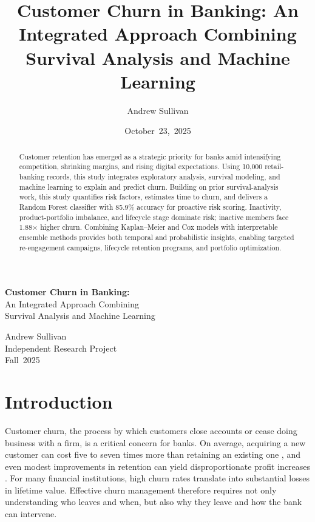 \documentclass[12pt]{article}
\title{Customer Churn in Banking: An Integrated Approach Combining Survival Analysis and Machine Learning}
\author{Andrew Sullivan}
\date{October~23,~2025}
\begin{document}
\begin{titlepage}
  \centering
  \vspace*{2cm}
  \Huge\textbf{Customer Churn in Banking:}\\An Integrated Approach Combining\\Survival Analysis and Machine Learning
  \vspace{1.5cm}

  \large
  Andrew Sullivan\\[0.5cm]
  Independent Research Project\\[0.5cm]
  Fall~2025
  
  \vfill
\end{titlepage}
\thispagestyle{plain}

\newpage
\thispagestyle{plain}
\begin{abstract}
Customer retention has emerged as a strategic priority for banks amid intensifying competition, shrinking margins, and rising digital expectations. Using 10,000 retail-banking records, this study integrates exploratory analysis, survival modeling, and machine learning to explain and predict churn. Building on prior survival-analysis work, this study quantifies risk factors, estimates time to churn, and delivers a Random Forest classifier with 85.9\% accuracy for proactive risk scoring. Inactivity, product-portfolio imbalance, and lifecycle stage dominate risk; inactive members face 1.88× higher churn. Combining Kaplan–Meier and Cox models with interpretable ensemble methods provides both temporal and probabilistic insights, enabling targeted re-engagement campaigns, lifecycle retention programs, and portfolio optimization.
\end{abstract}

\newpage
{}
\pagestyle{plain}
\tableofcontents
\newpage
{}
\pagestyle{fancy}

\section{Introduction}
Customer churn, the process by which customers close accounts or cease doing business with a firm, is a critical concern for banks. On average, acquiring a new customer can cost five to seven times more than retaining an existing one \citep{businessbuilders2024cost}, and even modest improvements in retention can yield disproportionate profit increases \citep{kumar2022customerretention}. For many financial institutions, high churn rates translate into substantial losses in lifetime value. Effective churn management therefore requires not only understanding who leaves and when, but also why they leave and how the bank can intervene.
\end{document}
